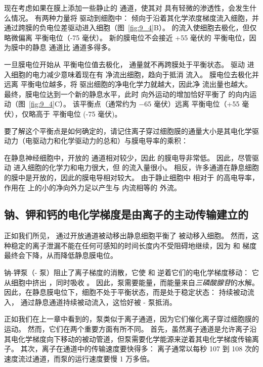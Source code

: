 现在考虑如果在膜上添加一些静止的  通道，使其对  具有轻微的渗透性，会发生什么情况。
有两种力量将  驱动到细胞中： 倾向于沿着其化学浓度梯度流入细胞，并通过跨膜的负电位差驱动进入细胞（图~\ref{fig:9_4}B）。
 的流入使细胞去极化，但仅略微偏离  平衡电位（-75 毫伏）。
新的膜电位不会接近 +55 毫伏的  平衡电位，因为膜中的静息  通道比  通道多得多。


一旦膜电位开始从  平衡电位值去极化， 通量就不再跨膜处于平衡状态。
驱动  进入细胞的电力减少意味着现在有  净流出细胞，趋向于抵消  流入。
膜电位去极化并远离  平衡电位越多，将  驱出细胞的净电化学力就越大，因此净  流出量也越大。
最终，膜电位达到一个新的静息水平，此时  向外运动的增加恰好平衡了  的向内运动（图~\ref{fig:9_4}C）。
该平衡点（通常约为 −65 毫伏）远离  平衡电位（+55 毫伏），仅略高于  平衡电位 (-75 毫伏)。


要了解这个平衡点是如何确定的，请记住离子穿过细胞膜的通量大小是其电化学驱动力（电驱动力和化学驱动力的总和）与膜电导率的乘积：


在静息神经细胞中，开放的  通道相对较少，因此  的膜电导非常低。
因此，尽管驱动  进入细胞的化学力和电力很大，但  的流入量很小。
相反，许多通道在静息细胞的膜中是开放的，因此的膜电导相对较大。
由于静止细胞中  相对于  的高电导率，作用在  上的小的净向外力足以产生与  内流相等的  外流。



\subsection{钠、钾和钙的电化学梯度是由离子的主动传输建立的}

正如我们所见， 通过开放通道被动移出静息细胞平衡了  被动移入细胞。
然而，这种稳定的离子泄漏不能在任何可感知的时间长度内不受阻碍地继续，因为  和  梯度最终会下降，从而降低静息膜电位。


钠-钾泵（- 泵）阻止了离子梯度的消散，它使  和  逆着它们的电化学梯度移动：
它从细胞中挤出 ，同时吸收 。
因此，泵需要能量，而能量来自\textit{三磷酸腺苷}的水解。
因此，在静息膜电位下，细胞不处于平衡状态，而是处于稳定状态： 持续被动流入， 通过静息通道持续被动流入，这恰好被 - 泵抵消。


正如我们在上一章中看到的，泵类似于离子通道，因为它们催化离子穿过细胞膜的运动。
然而，它们在两个重要方面有所不同。
首先，虽然离子通道是允许离子沿其电化学梯度向下移动的被动管道，但泵需要化学能源来逆着其电化学梯度传输离子。
其次，离子在通道中的传输速度要快得多：
离子通常以每秒 107 到 108 次的速度流过通道，而泵的运行速度要慢 1 万多倍。


